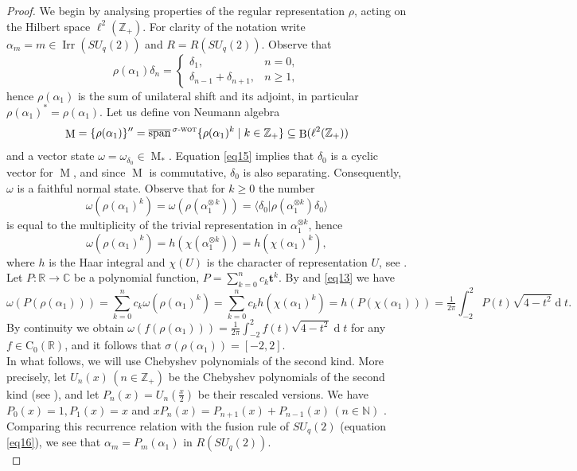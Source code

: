 \documentclass[11 pt, leqno]{amsart}
\newcommand{\ov}{\overline}
\newcommand{\mrm}{\mathrm}
\newcommand{\md}{\operatorname{d}\!}
\newcommand{\la}{\langle}
\newcommand{\ra}{\rangle}
\newcommand{\NN}{\mathbb{N}}
\newcommand{\RR}{\mathbb{R}}
\newcommand{\CC}{\mathbb{C}}
\newcommand{\ZZ}{\mathbb{Z}}
\newcommand{\swot}{\ifmmode \sigma\textsc{-wot} \else $\sigma$-\textsc{wot}\fi}
\DeclareMathOperator{\lin}{span}
\DeclareMathOperator{\Irr}{Irr}
\DeclareMathOperator{\B}{B}
\DeclareMathOperator{\M}{M}
\theoremstyle{definition}
\numberwithin{equation}{section}
\begin{document}
\begin{proof}
We begin by analysing properties of the regular representation $\rho$, acting on the Hilbert space $\ell^2(\ZZ_+)$. For clarity of the notation write $\alpha_m=m\in \Irr(SU_q(2))$ and $R=R(SU_q(2))$. Observe that
	\begin{equation}\label{eq15}
	\rho(\alpha_1)\delta_n=\begin{cases}
	\delta_1, & n=0, \\
	\delta_{n-1}+\delta_{n+1}, & n\ge 1,
	\end{cases}
	\end{equation}
	hence $\rho(\alpha_1)$ is the sum of unilateral shift and its adjoint, in particular $\rho(\alpha_1)^*=\rho(\alpha_1)$. Let us define von Neumann algebra
\[
	\M=\{\rho(\alpha_1)\}''=
	\ov{\lin}^{\,\swot}\{\rho(\alpha_1)^k\mid k\in \ZZ_+\}\subseteq \B(\ell^2(\ZZ_+))
	\]
	and a vector state $	\omega=\omega_{\delta_0}\in \M_*$. Equation \eqref{eq15} implies that $\delta_0$ is a cyclic vector for $\M$, and since $\M$ is commutative, $\delta_0$ is also separating. Consequently, $\omega$ is a faithful normal state. Observe that for $k\ge 0$ the number
	\[
	\omega(\rho(\alpha_1)^k)=
	\omega(\rho(\alpha_1^{\otimes\, k}))=
	\la \delta_0 | \rho(\alpha_1^{\otimes k}) \delta_0\ra 
	\]
	is equal to the multiplicity of the trivial representation in $\alpha_1^{\otimes k}$, hence
	\begin{equation}\label{eq13}
	\omega(\rho(\alpha_1)^k)=h(\chi(\alpha_1^{\otimes k}))=
	h(\chi(\alpha_1)^k),
	\end{equation}
where $h$ is the Haar integral and $\chi(U)$ is the character of representation $U$, see \cite{NeshveyevTuset}. Let $P\colon \RR\rightarrow \CC$ be a polynomial function, $P=\sum_{k=0}^{n} c_k \boldsymbol{t}^k$. By \cite[Proposition 6.2.11]{Timmermann} and \eqref{eq13} we have
	\[
	\omega ( P(\rho(\alpha_1)))=
	\sum_{k=0}^{n} c_k \omega( \rho(\alpha_1)^k)=
	\sum_{k=0}^{n} c_k h( \chi(\alpha_1)^{k})=
	h(P(\chi(\alpha_1)))=
	\tfrac{1}{2\pi} \int_{-2}^{2} P(t) \sqrt{4-t^2} \md t.
	\]
By continuity we obtain $\omega ( f(\rho(\alpha_1)))=
	\tfrac{1}{2\pi} \int_{-2}^{2} f(t) \sqrt{4-t^2} \md t$ for any $f\in \mrm{C}_0(\RR)$, and it follows that $\sigma(\rho(\alpha_1))=\left[-2,2\right]$. \\

In what follows, we will use Chebyshev polynomials of the second kind. More precisely, let $U_n(x)\,(n\in\ZZ_+)$ be the Chebyshev polynomials of the second kind (see \cite[Chapter 18]{NIST}), and let $P_n(x)=U_n(\tfrac{x}{2})$ be their rescaled versions. We have $P_0(x)=1, P_1(x)=x$ and $x P_n(x)=P_{n+1}(x)+P_{n-1}(x)\,(n\in\NN)$ \cite[Section 18.5, 18.9]{NIST}. Comparing this recurrence relation with the fusion rule of $SU_q(2)$ (equation \eqref{eq16}), we see that $\alpha_m=P_m(\alpha_1)$ in $R(SU_q(2))$.\\


\end{proof}
\end{document}
